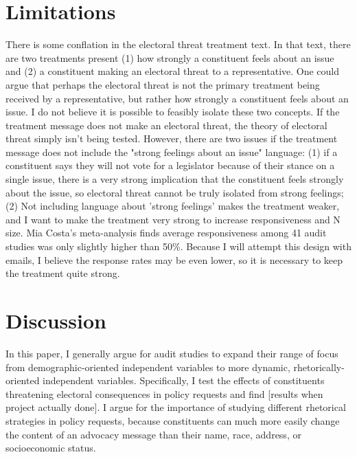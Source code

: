 \documentclass[12pt]{article}\usepackage[]{graphicx}\usepackage[]{color}
\begin{document}
 

\section{Limitations}
There is some conflation in the electoral threat treatment text. In that text, there are two treatments present (1) how strongly a constituent feels about an issue and (2) a constituent making an electoral threat to a representative. One could argue that perhaps the electoral threat is not the primary treatment being received by a representative, but rather how strongly a constituent feels about an issue. I do not believe it is possible to feasibly isolate these two concepts. If the treatment message does not make an electoral threat, the theory of electoral threat simply isn't being tested. However, there are two issues if the treatment message does not include the "strong feelings about an issue" language: (1) if a constituent says they will not vote for a legislator because of their stance on a single issue, there is a very strong implication that the constituent feels strongly about the issue, so electoral threat cannot be truly isolated from strong feelings; (2) Not including language about 'strong feelings' makes the treatment weaker, and I want to make the treatment very strong to increase responsiveness and N size. Mia Costa's meta-analysis finds average responsiveness among 41 audit studies was only slightly higher than 50\%. Because I will attempt this design with emails, I believe the response rates may be even lower, so it is necessary to keep the treatment quite strong.

\section{Discussion}
In this paper, I generally argue for audit studies to expand their range of focus from demographic-oriented independent variables to more dynamic, rhetorically-oriented independent variables. Specifically, I test the effects of constituents threatening electoral consequences in policy requests and find [results when project actually done]. I argue for the importance of studying different rhetorical strategies in policy requests, because constituents can much more easily change the content of an advocacy message than their name, race, address, or socioeconomic status. 




\end{document}

